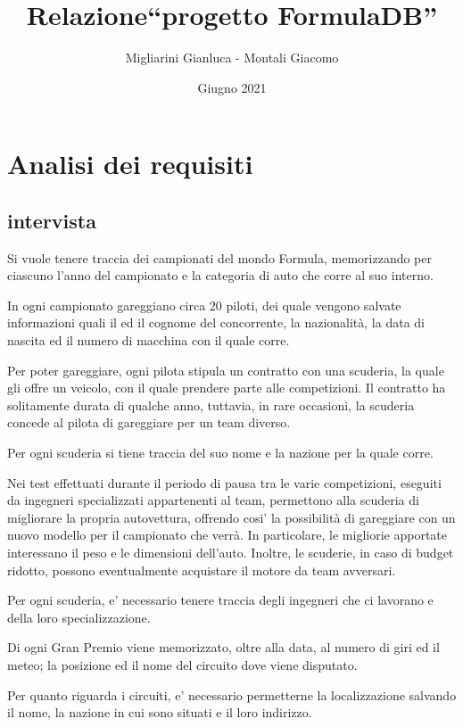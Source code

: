 \documentclass[a4paper,12pt]{report}
\title{Relazione\break``progetto FormulaDB''}
\author{Migliarini Gianluca - Montali Giacomo}
\date{Giugno 2021}
\begin{document}
	
	\maketitle
	\chapter{Analisi dei requisiti}
		\section{intervista}
		
		Si vuole tenere traccia dei campionati del mondo Formula, memorizzando per ciascuno l'anno del campionato e la categoria di auto che corre al suo interno.
		
		In ogni campionato gareggiano circa 20 piloti, dei quale vengono salvate informazioni quali il ed il cognome del concorrente,
		la nazionalità, la data di nascita ed il numero di macchina con il quale corre.
		
		Per poter gareggiare, ogni pilota stipula un contratto con una scuderia, la quale gli offre un veicolo, con il quale
		prendere parte alle competizioni. Il contratto ha solitamente durata di qualche anno, tuttavia, in rare occasioni,
		la scuderia concede al pilota di gareggiare per un team diverso.
		
		Per ogni scuderia si tiene traccia del suo nome e la nazione per la quale corre.
		
		Nei test effettuati durante il periodo di pausa tra le varie competizioni, eseguiti da ingegneri specializzati appartenenti al team,
		permettono alla scuderia di migliorare la propria autovettura, offrendo cosi' la possibilità di gareggiare
		con un nuovo modello per il campionato che verrà. In particolare, le migliorie apportate interessano il peso e le dimensioni dell'auto.
		Inoltre, le scuderie, in caso di budget ridotto, possono eventualmente acquistare il motore da team avversari.
		
		Per ogni scuderia, e' necessario tenere traccia degli ingegneri che ci lavorano e della loro specializzazione.
		
		Di ogni Gran Premio viene memorizzato, oltre alla data, al numero di giri ed il meteo;
		la posizione ed il nome del circuito dove viene disputato.
		
		Per quanto riguarda i circuiti, e' necessario permetterne la localizzazione salvando il nome, la nazione in cui sono situati e il loro indirizzo.
		
\end{document}
